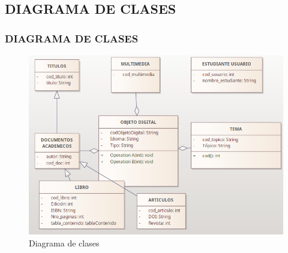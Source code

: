 \documentclass[article]{beamer}
\begin{document}
\subsection{DIAGRAMA DE CLASES}
\begin{frame}
\frametitle{DIAGRAMA DE CLASES}
\begin{figure}[h]
	\centering
	\includegraphics[scale=0.4]{images/clase2}
	\caption{Diagrama de clases }
\end{figure}
\end{frame}
\end{document}
